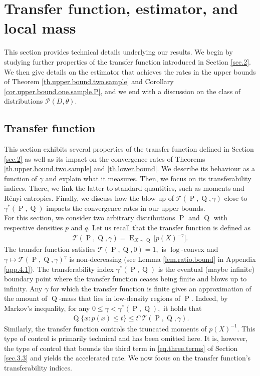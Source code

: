 \documentclass[10pt]{article}
\newcommand{\mP}{\mathcal{P}}
\newcommand{\mT}{\mathcal{T}}
\newcommand{\E}{\operatorname{E}}
\renewcommand{\P}{\operatorname{P}}
\newcommand{\Q}{\operatorname{Q}}
\begin{document}
\section{Transfer function, estimator, and local mass}
\label{sec.4}

This section provides technical details underlying our results. We begin by studying further properties of the transfer function introduced in Section \ref{sec.2}. We then give details on the estimator that achieves the rates in the upper bounds of Theorem \ref{th.upper.bound.two.sample} and Corollary \ref{cor.upper.bound.one.sample.P}, and we end with a discussion on the class of distributions $\mP(D, \theta).$


\subsection{Transfer function}
\label{sec.4.1}

This section exhibits several properties of the transfer function defined in Section \ref{sec.2} as well as its impact on the convergence rates of Theorems \ref{th.upper.bound.two.sample} and \ref{th.lower.bound}. We describe its behaviour as a function of $\gamma$ and explain what it measures. Then, we focus on its transferability indices. There, we link the latter to standard quantities, such as moments and R\'enyi entropies. Finally, we discuss how the blow-up of $\mT(\P, \Q, \gamma)$ close to $\gamma^*(\P, \Q)$ impacts the convergence rates in our upper bounds.\\

For this section, we consider two arbitrary distributions $\P$ and $\Q$ with respective densities $p$ and $q.$ Let us recall that the transfer function is defined as 
\begin{align*}
    \mT(\P, \Q, \gamma) = \E_{X \sim \Q} \big[p(X)^{-\gamma}\big].
\end{align*}
The transfer function satisfies $\mT(\P, \Q, 0) = 1,$ is $\log$-convex and $\gamma \mapsto \mT(\P, \Q, \gamma)^\gamma$ is non-decreasing (see Lemma \ref{lem.ratio.bound} in Appendix \ref{app.4.1}). The transferability index $\gamma^*(\P, \Q)$ is the eventual (maybe infinite) boundary point where the transfer function ceases being finite and blows up to infinity. Any $\gamma$ for which the transfer function is finite gives an approximation of the amount of $\Q$-mass that lies in low-density regions of $\P.$ Indeed, by Markov's inequality, for any $0 \leq \gamma < \gamma^*(\P, \Q),$ it holds that 
\begin{align*}
    \Q\{x: p(x) \leq t\} \leq t^{\gamma}\mT(\P, \Q, \gamma).
\end{align*}
Similarly, the transfer function controls the truncated moments of $p(X)^{-1}$. This type of control is primarily technical and has been omitted here. It is, however, the type of control that bounds the third term in \eqref{eq.three.terms} of Section \ref{sec.3.3} and yields the accelerated rate. We now focus on the transfer function's transferability indices.
\end{document}
